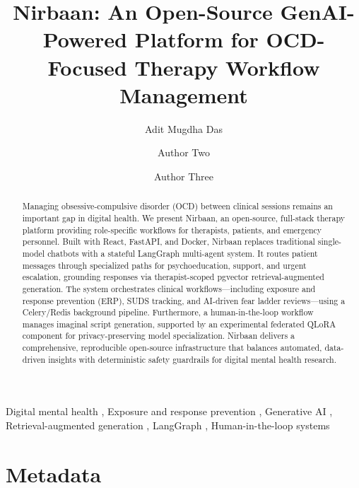 \documentclass[preprint,12pt,a4paper]{elsarticle}
\begin{document}
\begin{frontmatter}

\title{Nirbaan: An Open-Source GenAI-Powered Platform for OCD-Focused Therapy Workflow Management}

\author[inst1]{Adit Mugdha Das}
\author[inst1]{Author Two}
\author[inst1]{Author Three}


\begin{abstract}
Managing obsessive-compulsive disorder (OCD) between clinical sessions remains an important gap in digital health. We present Nirbaan, an open-source, full-stack therapy platform providing role-specific workflows for therapists, patients, and emergency personnel. Built with React, FastAPI, and Docker, Nirbaan replaces traditional single-model chatbots with a stateful LangGraph multi-agent system. It routes patient messages through specialized paths for psychoeducation, support, and urgent escalation, grounding responses via therapist-scoped pgvector retrieval-augmented generation. The system orchestrates clinical workflows---including exposure and response prevention (ERP), SUDS tracking, and AI-driven fear ladder reviews---using a Celery/Redis background pipeline. Furthermore, a human-in-the-loop workflow manages imaginal script generation, supported by an experimental federated QLoRA component for privacy-preserving model specialization. Nirbaan delivers a comprehensive, reproducible open-source infrastructure that balances automated, data-driven insights with deterministic safety guardrails for digital mental health research.
\end{abstract}

\begin{keyword}
Digital mental health \sep
Exposure and response prevention \sep
Generative AI \sep
Retrieval-augmented generation \sep
LangGraph \sep
Human-in-the-loop systems
\end{keyword}

\end{frontmatter}

\section*{Metadata}
\end{document}
